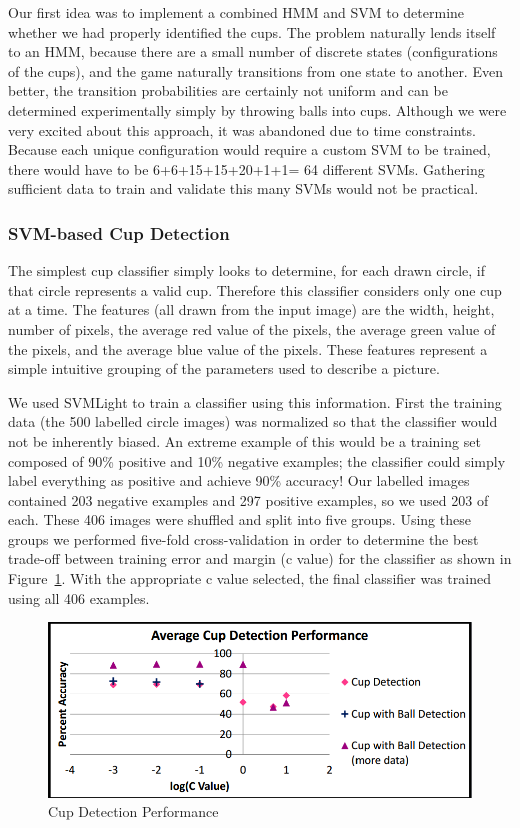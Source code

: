 \documentclass[letterpaper, 10 pt, conference]{ieeeconf}  %
\begin{document}
Our first idea was to implement a combined HMM and SVM to determine whether we had properly identified the cups.  The problem naturally lends itself to an HMM, because there are a small number of discrete states (configurations of the cups), and the game naturally transitions from one state to another.  Even better, the transition probabilities are certainly not uniform and can be determined experimentally simply by throwing balls into cups.  Although we were very excited about this approach, it was abandoned due to time constraints.  Because each unique configuration would require a custom SVM to be trained, there would have to be 6+6+15+15+20+1+1= 64 different SVMs.  Gathering sufficient data to train and validate this many SVMs would not be practical.

\subsubsection{SVM-based Cup Detection}

The simplest cup classifier simply looks to determine, for each drawn circle, if that circle represents a valid cup.  Therefore this classifier considers only one cup at a time.  The features (all drawn from the input image) are the width, height, number of pixels, the average red value of the pixels, the average green value of the pixels, and the average blue value of the pixels.  These features represent a simple intuitive grouping of the parameters used to describe a picture.  

We used SVMLight to train a classifier using this information.  First the training data (the 500 labelled circle images) was normalized so that the classifier would not be inherently biased.  An extreme example of this would be a training set composed of 90\% positive and 10\% negative examples; the classifier could simply label everything as positive and achieve 90\% accuracy!  Our labelled images contained 203 negative examples and 297 positive examples, so we used 203 of each.  These 406 images were shuffled and split into five groups.  Using these groups we performed five-fold cross-validation in order to determine the best trade-off between training error and margin (c value) for the classifier as shown in Figure~\ref{fig:cvalue}.  With the appropriate c value selected, the final classifier was trained using all 406 examples.
\begin{figure}[thpb]
      \centering
	  \includegraphics[scale =0.3]{cvalue}
      \caption{Cup Detection Performance}
      \label{fig:cvalue}
\end{figure}
\end{document}
